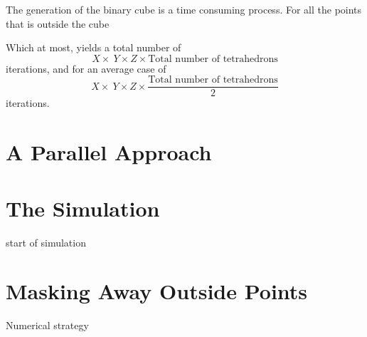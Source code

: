 The generation of the binary cube is a time consuming process. For all the points that is outside the cube 

Which at most, yields a total number of 
\begin{equation} 
X \times\ Y \times Z  \times \textrm{Total number of tetrahedrons}
\end{equation}  
iterations, and for an average case of 
\begin{equation} 
X \times\ Y \times Z  \times \frac{\textrm{Total number of tetrahedrons}}{2}
\end{equation} 
iterations.  

\section{A Parallel Approach}

\section{The Simulation}
start of simulation

\section{Masking Away Outside Points}
Numerical strategy





